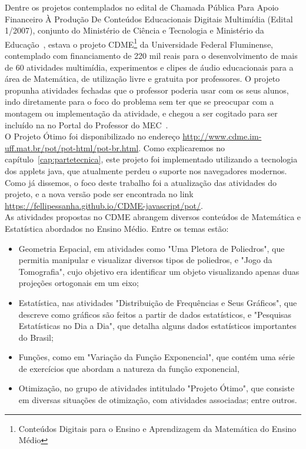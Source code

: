 Dentre os projetos contemplados no edital de Chamada Pública Para Apoio Financeiro À Produção De Conteúdos Educacionais Digitais Multimídia (Edital 1/2007), conjunto do Ministério de Ciência e Tecnologia e Ministério da Educação~\cite{editalCDME}, estava o projeto CDME\footnote{Conteúdos Digitais para o Ensino e Aprendizagem da Matemática do Ensino Médio} da Universidade Federal Fluminense, contemplado com financiamento de 220 mil reais para o desenvolvimento de mais de 60 atividades multimídia, experimentos e clipes de áudio educacionais para a área de Matemática, de utilização livre e gratuita por professores. O projeto propunha atividades fechadas que o professor poderia usar com os seus alunos, indo diretamente para o foco do problema sem ter que se preocupar com a montagem ou implementação da atividade, e chegou a ser cogitado para ser incluído na no Portal do Professor do MEC~\cite{bortolossiaulas}. \\

O Projeto Ótimo foi disponibilizado no endereço \url{http://www.cdme.im-uff.mat.br/pot/pot-html/pot-br.html}. Como explicaremos no capítulo~\ref{cap:partetecnica}, este projeto foi implementado utilizando a tecnologia dos applets java, que atualmente perdeu o suporte nos navegadores modernos. Como já dissemos, o foco deste trabalho foi a atualização das atividades do projeto, e a nova versão pode ser encontrada no link \url{https://fellipessanha.github.io/CDME-javascript/pot/}.\\

As atividades propostas no CDME abrangem diversos conteúdos de Matemática e Estatística abordados no Ensino Médio. Entre os temas estão: 

\begin{itemize}
    \item Geometria Espacial, em atividades como "Uma Pletora de Poliedros", que permitia manipular e visualizar diversos tipos de poliedros, e "Jogo da Tomografia", cujo objetivo era identificar um objeto visualizando apenas duas projeções ortogonais em um eixo;
    
    \item Estatística, nas atividades "Distribuição de Frequências e Seus Gráficos", que descreve como gráficos são feitos a partir de dados estatísticos, e "Pesquisas Estatísticas no Dia a Dia", que detalha alguns dados estatísticos importantes do Brasil;
    
    \item Funções, como em "Variação da Função Exponencial", que contém uma série de exercícios que abordam a natureza da função exponencial,
    
    \item Otimização, no grupo de atividades intitulado "Projeto Ótimo", que consiste em diversas situações de otimização, com atividades associadas; entre outros.
\end{itemize}

